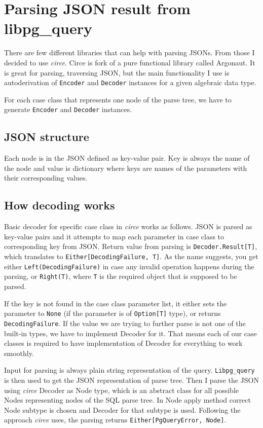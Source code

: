 \section{Parsing JSON result from libpg\_query}
There are few different libraries that can help with parsing JSONs. From those I decided to use \textit{circe}. Circe is fork of a pure functional library called Argonaut. It is great for parsing, traversing JSON, but the main functionality I use is autoderivation of \texttt{Encoder} and \texttt{Decoder} instances for a given algebraic data type. 

For each case class that represents one node of the parse tree, we have to generate \texttt{Encoder} and \texttt{Decoder} instances.

\subsection{JSON structure}
Each node is in the JSON defined as key-value pair. Key is always the name of the node and value is dictionary where keys are names of the parameters with their corresponding values. 

\subsection{How decoding works}
Basic decoder for specific case class in \textit{circe} works as follows. JSON is parsed as key-value pairs and it attempts to map each parameter in case class to corresponding key from JSON. Return value from parsing is \texttt{Decoder.Result[T]}, which translates to \texttt{Either[DecodingFailure, T]}. As the name suggests, you get either \texttt{Left(DecodingFailure)} in case any invalid operation happens during the parsing, or \texttt{Right(T)}, where \texttt{T} is the required object that is supposed to be parsed. 

If the key is not found in the case class parameter list, it either sets the parameter to \texttt{None} (if the parameter is of \texttt{Option[T]} type), or returns \texttt{DecodingFailure}. If the value we are trying to further parse is not one of the built-in types, we have to implement Decoder for it. That means each of our case classes is required to have implementation of Decoder for everything to work smoothly.

Input for parsing is always plain string representation of the query. \texttt{Libpg\_query} is then used to get the JSON representation of parse tree. Then I parse the JSON using \textit{circe} Decoder as Node type, which is an abstract class for all possible Nodes representing nodes of the SQL parse tree. In Node apply method correct Node subtype is chosen and Decoder for that subtype is used. Following the approach \textit{circe} uses, the parsing returns \texttt{Either[PgQueryError, Node]}.

